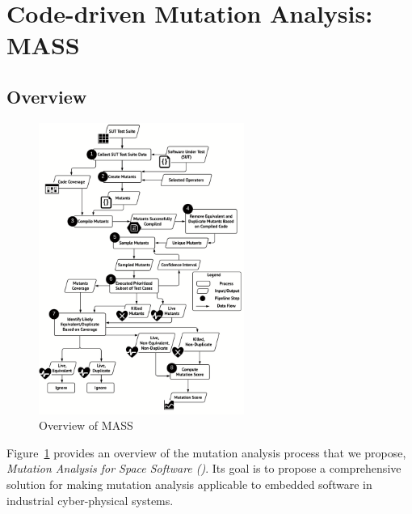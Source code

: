 \section{Code-driven Mutation Analysis: MASS}
\label{ch:mass:approach}

\subsection{Overview}
\label{sec:approach}

\begin{figure}[tb]
\begin{center}
\includegraphics[width=0.6\textwidth]{images/Approach}
\caption{Overview of MASS}
\label{fig:approach}
\end{center}
\end{figure}

Figure~\ref{fig:approach} provides an overview of the mutation analysis process that we propose, \emph{Mutation Analysis for Space Software (\APPR)}. Its goal is to propose a comprehensive solution for making mutation analysis applicable to embedded software in industrial cyber-physical systems. 

